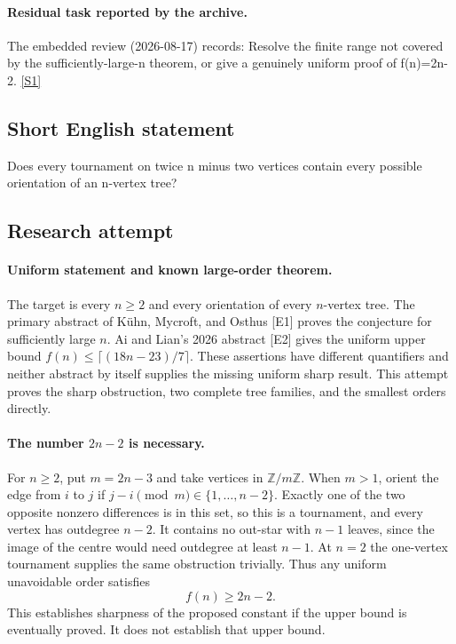\documentclass[11pt,a4paper]{article}
\newcommand{\Z}{\mathbb{Z}}
\newcommand{\sref}[2]{\hyperlink{source:#1:#2}{[S#2]}}
\begin{document}
\paragraph{Residual task reported by the archive.}

The embedded review (2026-08-17) records: Resolve the finite range not covered by the sufficiently-large-n theorem, or give a genuinely uniform proof of f(n)=2n-2. \sref{1424}{1}

\subsection{Short English statement}

Does every tournament on twice n minus two vertices contain every possible orientation of an n-vertex tree?

\subsection{Research attempt}

\paragraph{Uniform statement and known large-order theorem.}
The target is every $n\ge2$ and every orientation of every $n$-vertex
tree. The primary abstract of K\"uhn, Mycroft, and Osthus [E1] proves
the conjecture for sufficiently large $n$. Ai and Lian's 2026 abstract
[E2] gives the uniform upper bound
$f(n)\le\lceil(18n-23)/7\rceil$. These assertions have different
quantifiers and neither abstract by itself supplies the missing uniform
sharp result. This attempt proves the sharp obstruction, two complete
tree families, and the smallest orders directly.

\paragraph{The number $2n-2$ is necessary.}
For $n\ge2$, put $m=2n-3$ and take vertices in $\Z/m\Z$.
When $m>1$, orient the edge from $i$ to $j$ if
$j-i\pmod m\in\{1,\ldots,n-2\}$. Exactly one of the two
opposite nonzero differences is in this set, so this is a tournament,
and every vertex has outdegree $n-2$. It contains no out-star with
$n-1$ leaves, since the image of the centre would need outdegree
at least $n-1$. At $n=2$ the one-vertex tournament supplies the
same obstruction trivially. Thus any uniform unavoidable order satisfies
\[
                              f(n)\ge2n-2.
\]
This establishes sharpness of the proposed constant if the upper bound
is eventually proved. It does not establish that upper bound.
\end{document}
